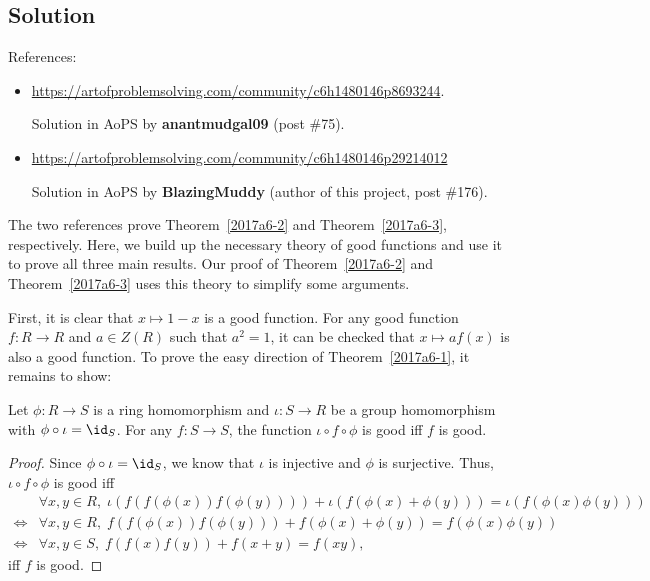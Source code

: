 \subsection*{Solution}

References:
\begin{itemize}
    
    \item
    \url{https://artofproblemsolving.com/community/c6h1480146p8693244}.
    
    Solution in AoPS by \textbf{anantmudgal09} (post \#75).

    \item
    \url{https://artofproblemsolving.com/community/c6h1480146p29214012}

    Solution in AoPS by \textbf{BlazingMuddy} (author of this project, post \#176).

\end{itemize}

The two references prove Theorem~\ref{2017a6-2} and Theorem~\ref{2017a6-3}, respectively.
Here, we build up the necessary theory of good functions and use it to prove all three main results.
Our proof of Theorem~\ref{2017a6-2} and Theorem~\ref{2017a6-3} uses this theory to simplify some arguments.

First, it is clear that $x \mapsto 1 - x$ is a good function.
For any good function $f : R \to R$ and $a \in Z(R)$ such that $a^2 = 1$, it can be checked that $x \mapsto a f(x)$ is also a good function.
To prove the easy direction of Theorem~\ref{2017a6-1}, it remains to show:

\begin{lemma}\label{2017a6-good-hom}
Let $\phi : R \to S$ is a ring homomorphism and $\iota : S \to R$ be a group homomorphism with $\phi \circ \iota = \id_S$.
For any $f : S \to S$, the function $\iota \circ f \circ \phi$ is good iff $f$ is good.
\end{lemma}
\begin{proof}
Since $\phi \circ \iota = \id_S$, we know that $\iota$ is injective and $\phi$ is surjective.
Thus, $\iota \circ f \circ \phi$ is good iff
\begin{align*}
    &\forall x, y \in R, \; \iota(f(f(\phi(x)) f(\phi(y)))) + \iota(f(\phi(x) + \phi(y))) = \iota(f(\phi(x) \phi(y))) \\
    \iff& \forall x, y \in R, \; f(f(\phi(x)) f(\phi(y))) + f(\phi(x) + \phi(y)) = f(\phi(x) \phi(y)) \\
    \iff& \forall x, y \in S, \; f(f(x) f(y)) + f(x + y) = f(xy),
\end{align*}
    iff $f$ is good.
\end{proof}

